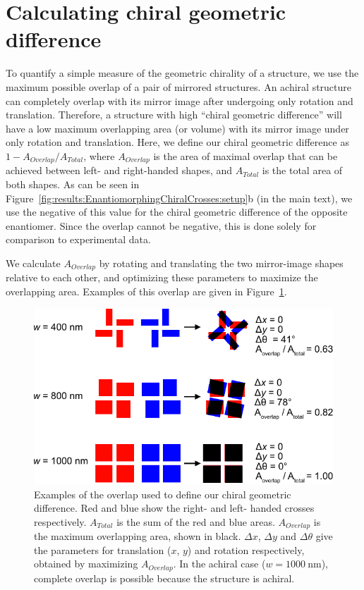 \section{Calculating chiral geometric difference}\label{sec:appendix:ChiralGeoDiff}

To quantify a simple measure of the geometric chirality of a structure, we use the maximum possible overlap of a pair of mirrored structures. An achiral structure can completely overlap with its mirror image after undergoing only rotation and translation. Therefore, a structure with high ``chiral geometric difference'' will have a low maximum overlapping area (or volume) with its mirror image under only rotation and translation. Here, we define our chiral geometric difference as $1 - A_{Overlap} / A_{Total}$,
where $A_{Overlap}$ is the area of maximal overlap that can be achieved between left- and right-handed shapes, and $A_{Total}$ is the total area of both shapes. 
As can be seen in Figure~\ref{fig:results:EnantiomorphingChiralCrosses:setup}b (in the main text), we use the negative of this value for the chiral geometric difference of the opposite enantiomer. Since the overlap cannot be negative, this is done solely for comparison to experimental data.

We calculate $A_{Overlap}$ by rotating and translating the two mirror-image shapes relative to each other, and optimizing these parameters to maximize the overlapping area. Examples of this overlap are given in Figure~\ref{fig:appendix:ChiralGeoDiff}.


\begin{figure}[htb!]	
    \centering	
    \includegraphics[scale=0.8]{./figures/results/EnantiomorphingChiralCrosses/geoDiff.pdf}
    \caption{\label{fig:appendix:ChiralGeoDiff}
    Examples of the overlap used to define our chiral geometric difference. Red and blue show the right- and left- handed crosses respectively.   $A_{Total}$ is the sum of the red and blue areas. $A_{Overlap}$ is the maximum overlapping area, shown in black. $\Delta x$, $\Delta y$ and $\Delta \theta$ give the parameters for translation ($x$, $y$) and rotation respectively, obtained by maximizing $A_{Overlap}$. In the achiral case ($w=\SI{1000}{\nano\m}$), complete overlap is possible because the structure is achiral. }	
\end{figure}